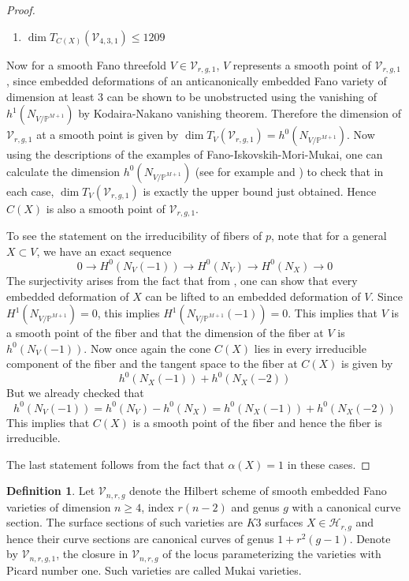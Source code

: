 \documentclass[11pt,twoside]{amsart}
\theoremstyle{plain}
\numberwithin{equation}{section}
\theoremstyle{definition}
\newtheorem{definition}[theorem]{Definition}
\begin{document}
\begin{proof}
\begin{enumerate}
      \item $\operatorname{dim}T_{C(X)}(\mathcal{V}_{4,3,1}) \leq 1209$
  \end{enumerate}
Now for a smooth Fano threefold $V \in \mathcal{V}_{r,g,1}$, $V$ represents a smooth point of $\mathcal{V}_{r,g,1}$, since embedded deformations of an anticanonically embedded Fano variety of dimension at least $3$ can be shown to be unobstructed using the vanishing of $h^1(N_{V/\mathbb{P}^{M+1}})$ by Kodaira-Nakano vanishing theorem. Therefore the dimension of $\mathcal{V}_{r,g,1}$ at a smooth point is given by $\operatorname{dim}T_V(\mathcal{V}_{r,g,1}) = h^0(N_{V/\mathbb{P}^{M+1}})$. Now using the descriptions of the examples of Fano-Iskovskih-Mori-Mukai, one can calculate the dimension $h^0(N_{V/\mathbb{P}^{M+1}})$ (see for example \cite[Table $2$, pg $666$]{CLM93} and \cite[Table $3.1$]{CLM98}) to check that in each case, $\operatorname{dim}T_V(\mathcal{V}_{r,g,1})$ is exactly the upper bound just obtained. Hence $C(X)$ is also a smooth point of $\mathcal{V}_{r,g,1}$. \par
To see the statement on the irreducibility of fibers of $p$, note that for a general $X \subset V$, we have an exact sequence 
$$0 \to H^0(N_V(-1)) \to H^0(N_V) \to H^0(N_X) \to 0$$
The surjectivity arises from the fact that from , one can show that every embedded deformation of $X$ can be lifted to an embedded deformation of $V$. Since $H^1(N_{V/\mathbb{P}^{M+1}}) = 0$, this implies $H^1(N_{V/\mathbb{P}^{M+1}}(-1)) = 0$. This implies that $V$ is a smooth point of the fiber and that the dimension of the fiber at $V$ is $h^0(N_V(-1))$. Now once again the cone $C(X)$ lies in every irreducible component of the fiber and the tangent space to the fiber at $C(X)$ is given by 
$$h^0(N_X(-1))+h^0(N_X(-2))$$
But we already checked that 
$$h^0(N_V(-1)) = h^0(N_V) - h^0(N_X) = h^0(N_X(-1))+h^0(N_X(-2))$$
This implies that $C(X)$ is a smooth point of the fiber and hence the fiber is irreducible. \par
The last statement follows from the fact that $\alpha(X) = 1$ in these cases. 

  
\end{proof}

\color{black}
\begin{definition}\label{Mukai varieties}
Let $\mathcal{V}_{n,r,g}$ denote the Hilbert scheme of smooth embedded Fano varieties of dimension $n \geq 4$, index $r(n-2)$ and genus $g$ with a canonical curve section. The surface sections of such varieties are $K3$ surfaces $X \in \mathcal{H}_{r,g}$ and hence their curve sections are canonical curves of genus $1+r^2(g-1)$. Denote by $\mathcal{V}_{n,r,g,1}$, the closure in $\mathcal{V}_{n,r,g}$ of the locus parameterizing the varieties with Picard number one. Such varieties are called Mukai varieties.
\end{definition}
\end{document}
